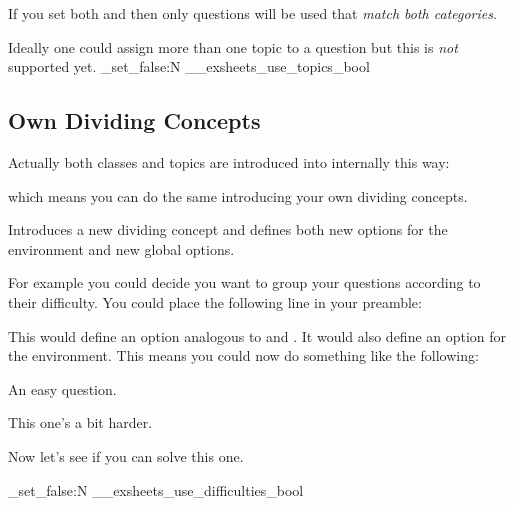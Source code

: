 \documentclass[DIV10,toc=index,toc=bib,numbers=noendperiod]{cnpkgdoc}
\begin{document}
If you set both  and  then only questions
will be used that \emph{match both categories}.

Ideally one could assign more than one topic to a question but this is
\emph{not} supported yet.
\ExplSyntaxOn
 \bool_set_false:N \g__exsheets_use_topics_bool
\ExplSyntaxOff

\subsection{Own Dividing Concepts}
\noindent{}Actually both classes and topics are introduced
into \ExSheets internally this way:
\begin{beispiel}
\end{beispiel}
which means you can do the same introducing your own dividing concepts.
\begin{beschreibung}
  \newline
    Introduces a new dividing concept and defines both new options for the
     environment and new global options.
\end{beschreibung}

For example you could decide you want to group your questions according to
their difficulty.  You could place the following line in your preamble:
\begin{beispiel}
\end{beispiel}
This would define an option  analogous to
 and .  It would also define an option
 for the  environment.  This means you could
now do something like the following:
\begin{beispiel}
 \begin{question}[difficulty=easy]
  An easy question.
 \end{question}
 \begin{question}[difficulty=medium]
  This one's a bit harder.
 \end{question}
 \begin{question}[difficulty=hard]
  Now let's see if you can solve this one.
 \end{question}
\end{beispiel}
\ExplSyntaxOn
 \bool_set_false:N \g__exsheets_use_difficulties_bool
\ExplSyntaxOff
\end{document}
